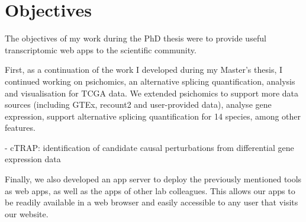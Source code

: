 \chapter{Objectives}

The objectives of my work during the PhD thesis were to provide useful transcriptomic web apps to the scientific community.

First, as a continuation of the work I developed during my Master's thesis, I continued working on psichomics, an alternative splicing quantification, analysis and visualisation for TCGA data. We extended psichomics to support more data sources (including GTEx, recount2 and user-provided data), analyse gene expression, support alternative splicing quantification for 14 species, among other features.

- cTRAP: identification of candidate causal perturbations from differential gene expression data

Finally, we also developed an app server to deploy the previously mentioned tools as web apps, as well as the apps of other lab colleagues. This allows our apps to be readily available in a web browser and easily accessible to any user that visits our website.